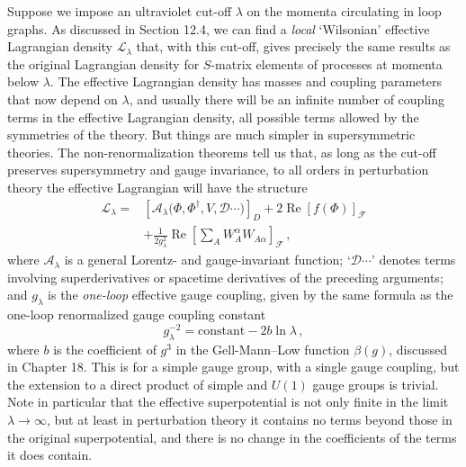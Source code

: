 Suppose we impose an ultraviolet cut-off \(\lambda\) on the momenta
circulating in loop graphs. As discussed in Section 12.4, we can find a
\emph{local} `Wilsonian' effective Lagrangian density \(\mathcal{L}_\lambda\)
that, with this cut-off, gives precisely the same results as the original
Lagrangian density for \(S\)-matrix elements of processes at momenta below
\(\lambda\). The effective Lagrangian density has masses and coupling
parameters that now depend on \(\lambda\), and usually there will be an
infinite number of coupling terms in the effective Lagrangian density, all
possible terms allowed by the symmetries of the theory. But things are much
simpler in supersymmetric theories. The non-renormalization theorems tell us
that, as long as the cut-off preserves supersymmetry and gauge invariance, to
all orders in perturbation theory the effective Lagrangian will have the
structure
\begin{equation}
  \begin{aligned}
  \mathcal{L}_\lambda
  ={}&
  \left[
    \mathcal{A}_\lambda
    \bigl(\Phi,\Phi^\dagger,V,\mathcal{D}\cdots\bigr)
  \right]_D
  +2\operatorname{Re}\left[f(\Phi)\right]_{\mathcal{F}}
  \\
  &+\frac{1}{2g_\lambda^2}\operatorname{Re}
  \left[
    \sum_A W_A^\alpha W_{A\alpha}
  \right]_{\mathcal{F}}\,,
  \end{aligned}
  \tag{27.6.2}\label{eq:27.6.2}
\end{equation}
where \(\mathcal{A}_\lambda\) is a general Lorentz- and gauge-invariant
function; `\(\mathcal{D}\cdots\)' denotes terms involving superderivatives or
spacetime derivatives of the preceding arguments; and \(g_\lambda\) is the
\emph{one-loop} effective gauge coupling, given by the same formula as the
one-loop renormalized gauge coupling constant
\begin{equation}
  g_\lambda^{-2}=\text{constant}-2b\ln\lambda\,,
  \tag{27.6.3}\label{eq:27.6.3}
\end{equation}
where \(b\) is the coefficient of \(g^3\) in the Gell-Mann--Low function
\(\beta(g)\), discussed in Chapter 18. This is for a simple gauge group, with
a single gauge coupling, but the extension to a direct product of simple and
\(U(1)\) gauge groups is trivial. Note in particular that the effective
superpotential is not only finite in the limit \(\lambda\longrightarrow
\infty\), but at least in perturbation theory it contains no terms beyond
those in the original superpotential, and there is no change in the
coefficients of the terms it does contain.


